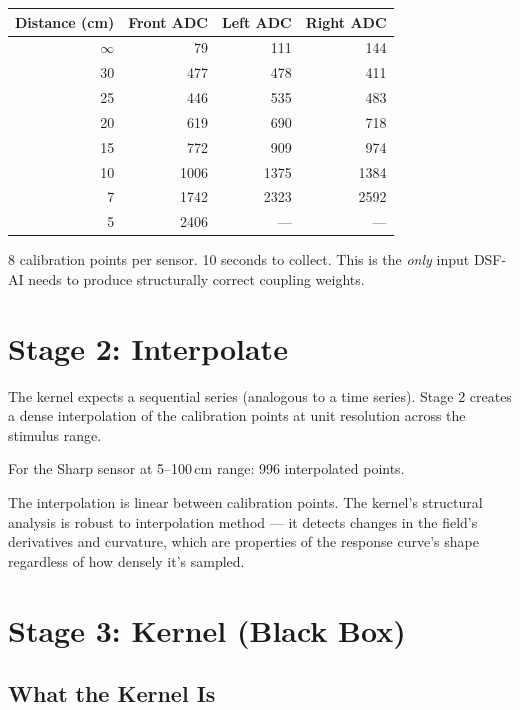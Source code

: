 \documentclass[11pt,a4paper]{article}
\begin{document}
\begin{center}
\begin{tabular}{@{}rrrr@{}}
\toprule
\textbf{Distance (cm)} & \textbf{Front ADC} & \textbf{Left ADC} & \textbf{Right ADC} \\
\midrule
$\infty$ & 79 & 111 & 144 \\
30 & 477 & 478 & 411 \\
25 & 446 & 535 & 483 \\
20 & 619 & 690 & 718 \\
15 & 772 & 909 & 974 \\
10 & 1006 & 1375 & 1384 \\
7 & 1742 & 2323 & 2592 \\
5 & 2406 & --- & --- \\
\bottomrule
\end{tabular}
\end{center}

8 calibration points per sensor. 10 seconds to collect. This is the
\textit{only} input DSF-AI needs to produce structurally correct
coupling weights.

\section{Stage 2: Interpolate}

The kernel expects a sequential series (analogous to a time series).
Stage 2 creates a dense interpolation of the calibration points at
unit resolution across the stimulus range.

For the Sharp sensor at 5--100\,cm range: 996 interpolated points.

The interpolation is linear between calibration points. The kernel's
structural analysis is robust to interpolation method --- it detects
changes in the field's derivatives and curvature, which are properties
of the response curve's shape regardless of how densely it's sampled.

\section{Stage 3: Kernel (Black Box)}

\subsection{What the Kernel Is}
\end{document}
